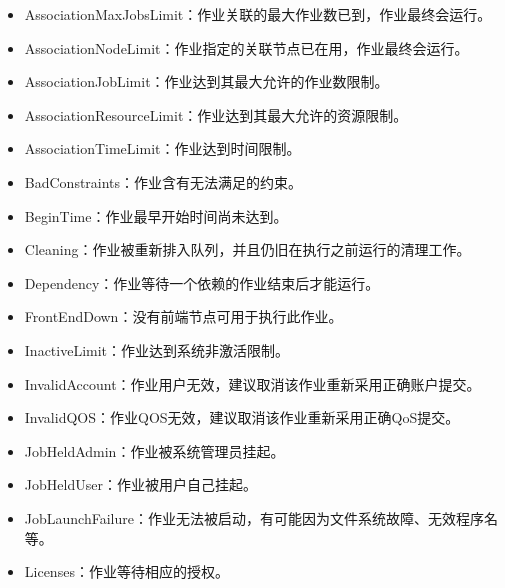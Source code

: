 \documentclass[a4paper,12pt,english]{sphinxmanual}
\begin{document}
\begin{itemize}
\begin{itemize}
\item {} 
\sphinxAtStartPar
AssociationMaxJobsLimit：作业关联的最大作业数已到，作业最终会运行。

\item {} 
\sphinxAtStartPar
AssociationNodeLimit：作业指定的关联节点已在用，作业最终会运行。

\item {} 
\sphinxAtStartPar
AssociationJobLimit：作业达到其最大允许的作业数限制。

\item {} 
\sphinxAtStartPar
AssociationResourceLimit：作业达到其最大允许的资源限制。

\item {} 
\sphinxAtStartPar
AssociationTimeLimit：作业达到时间限制。

\item {} 
\sphinxAtStartPar
BadConstraints：作业含有无法满足的约束。

\item {} 
\sphinxAtStartPar
BeginTime：作业最早开始时间尚未达到。

\item {} 
\sphinxAtStartPar
Cleaning：作业被重新排入队列，并且仍旧在执行之前运行的清理工作。

\item {} 
\sphinxAtStartPar
Dependency：作业等待一个依赖的作业结束后才能运行。

\item {} 
\sphinxAtStartPar
FrontEndDown：没有前端节点可用于执行此作业。

\item {} 
\sphinxAtStartPar
InactiveLimit：作业达到系统非激活限制。

\item {} 
\sphinxAtStartPar
InvalidAccount：作业用户无效，建议取消该作业重新采用正确账户提交。

\item {} 
\sphinxAtStartPar
InvalidQOS：作业QOS无效，建议取消该作业重新采用正确QoS提交。

\item {} 
\sphinxAtStartPar
JobHeldAdmin：作业被系统管理员挂起。

\item {} 
\sphinxAtStartPar
JobHeldUser：作业被用户自己挂起。

\item {} 
\sphinxAtStartPar
JobLaunchFailure：作业无法被启动，有可能因为文件系统故障、无效程序名等。

\item {} 
\sphinxAtStartPar
Licenses：作业等待相应的授权。


\end{itemize}
\end{itemize}
\end{document}

